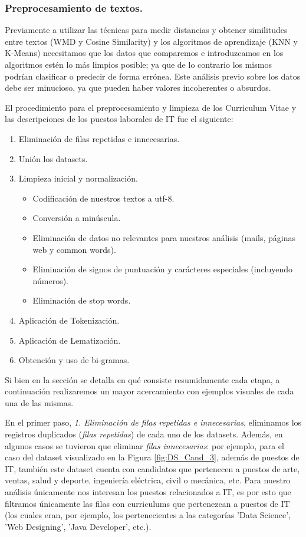 \documentclass[12pt,a4paper]{article}
\begin{document}
\begin{sloppypar}
\cleardoublepage

\subsubsection{Preprocesamiento de textos.}\label{preproc_practica}
Previamente a utilizar las técnicas para medir distancias y obtener similitudes entre textos (WMD y Cosine Similarity) y los algoritmos de aprendizaje (KNN y K-Means) necesitamos que los datos que comparemos e introduzcamos en los algoritmos estén lo más limpios posible; ya que de lo contrario los mismos podrían clasificar o predecir de forma errónea. Este análisis previo sobre los datos debe ser minucioso, ya que pueden haber valores incoherentes o absurdos.

El procedimiento para el preprocesamiento y limpieza de los Curriculum Vitae y las descripciones de los puestos laborales de IT fue el siguiente:

\begin{enumerate}
\item Eliminación de filas repetidas e innecesarias.
\item Unión los datasets.
\item Limpieza inicial y normalización.
\begin{itemize}
	\item Codificación de nuestros textos a utf-8.
    \item Conversión a minúscula.
    \item Eliminación de datos no relevantes para nuestros análisis (mails, páginas web y common words).
    \item Eliminación de signos de puntuación y carácteres especiales (incluyendo números).
    \item Eliminación de stop words.
\end{itemize}
\item Aplicación de Tokenización.
\item Aplicación de Lematización.
\item Obtención y uso de bi-gramas.
\end{enumerate}

Si bien en la sección \textit{} se detalla en qué consiste resumidamente cada etapa, a continuación realizaremos un mayor acercamiento con ejemplos visuales de cada una de las mismas.

En el primer paso, \textit{1. Eliminación de filas repetidas e innecesarias}, eliminamos los registros duplicados (\textit{filas repetidas}) de cada uno de los datasets. Además, en algunos casos se tuvieron que eliminar \textit{filas innecesarias}: por ejemplo, para el caso del dataset visualizado en la Figura \ref{fig:DS_Cand_3}, además de puestos de IT, también este dataset cuenta con candidatos que pertenecen a puestos de arte, ventas, salud y deporte, ingeniería eléctrica, civil o mecánica, etc. Para nuestro análisis únicamente nos interesan los puestos relacionados a IT, es por esto que filtramos únicamente las filas con curriculums que pertenezcan a puestos de IT (los cuales eran, por ejemplo, los pertenecientes a las categorías 'Data Science', 'Web Designing', 'Java Developer', etc.).


\end{sloppypar}
\end{document}
